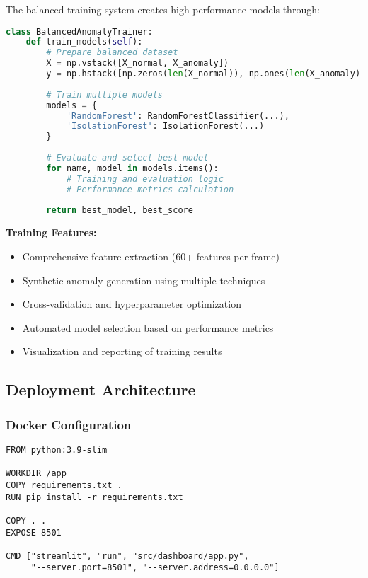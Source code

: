 \documentclass[12pt,a4paper]{article}
\begin{document}
The balanced training system creates high-performance models through:

\begin{lstlisting}[language=Python, caption=Balanced Training Process]
class BalancedAnomalyTrainer:
    def train_models(self):
        # Prepare balanced dataset
        X = np.vstack([X_normal, X_anomaly])
        y = np.hstack([np.zeros(len(X_normal)), np.ones(len(X_anomaly))])
        
        # Train multiple models
        models = {
            'RandomForest': RandomForestClassifier(...),
            'IsolationForest': IsolationForest(...)
        }
        
        # Evaluate and select best model
        for name, model in models.items():
            # Training and evaluation logic
            # Performance metrics calculation
        
        return best_model, best_score
\end{lstlisting}

\textbf{Training Features:}
\begin{itemize}
    \item Comprehensive feature extraction (60+ features per frame)
    \item Synthetic anomaly generation using multiple techniques
    \item Cross-validation and hyperparameter optimization
    \item Automated model selection based on performance metrics
    \item Visualization and reporting of training results
\end{itemize}

\subsection{Deployment Architecture}

\subsubsection{Docker Configuration}

\begin{lstlisting}[language=Docker, caption=Dockerfile Configuration]
FROM python:3.9-slim

WORKDIR /app
COPY requirements.txt .
RUN pip install -r requirements.txt

COPY . .
EXPOSE 8501

CMD ["streamlit", "run", "src/dashboard/app.py", 
     "--server.port=8501", "--server.address=0.0.0.0"]
\end{lstlisting}
\end{document}
